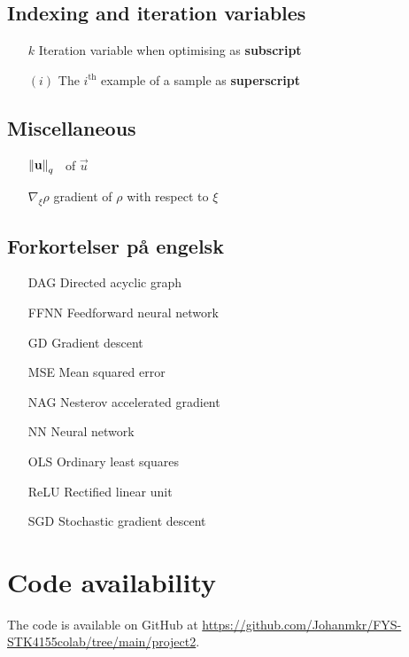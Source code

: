 \subsection{Indexing and iteration variables}
\begin{itemize}
    \item[$k$] Iteration variable when optimising as \textbf{subscript}
    \item[$(i)$] The $i^\mathrm{th}$ example of a sample as \textbf{superscript}
\end{itemize}


\subsection{Miscellaneous}

\begin{enumerate}[leftmargin=2.1em]
    \item[$\norm{\mathbf{u}}_q$] \lnorm[q]\, of $\vec{u}$
    \item[$\nabla_{\!\xi} \rho$] gradient of $\rho$ with respect to $\xi$
\end{enumerate}

\subsection{Forkortelser på engelsk}
\begin{enumerate}[leftmargin=2.6em]
    \item[DAG] Directed acyclic graph
    \item[FFNN] Feedforward neural network
    \item[GD] Gradient descent
    \item[MSE] Mean squared error 
    \item[NAG] Nesterov accelerated gradient
    \item[NN] Neural network 
    \item[OLS] Ordinary least squares 
    \item[ReLU] Rectified linear unit
    \item[SGD] Stochastic gradient descent 
\end{enumerate}








\section*{Code availability}
The code is available on GitHub at \url{https://github.com/Johanmkr/FYS-STK4155colab/tree/main/project2}.





